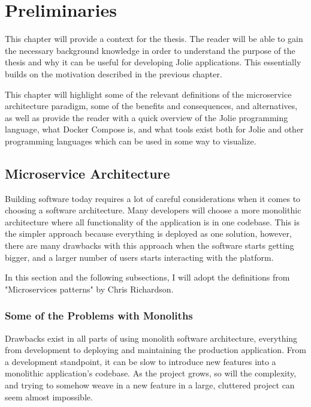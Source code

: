 \chapter{Preliminaries}
This chapter will provide a context for the thesis.
The reader will be able to gain the necessary background knowledge in order
to understand the purpose of the thesis and why it can be useful for developing Jolie applications. This 
essentially builds on the motivation
described in the previous chapter.

This chapter will highlight some of the relevant definitions of the microservice architecture paradigm, some of the benefits and consequences, and alternatives, as
 well as provide
the reader with a quick overview of the Jolie programming language,
what Docker Compose is, and what tools exist
both for Jolie and other programming languages which can be used in some way to visualize.

\section{Microservice Architecture}
Building software today requires a lot of careful considerations when it comes
to choosing a software architecture. Many developers will choose a more monolithic architecture where all
 functionality of the application
is in one codebase. This is the simpler approach because everything is deployed as one solution, however,
 there are many drawbacks
with this approach when the software starts getting bigger, and a larger number of users starts 
interacting with the platform.

In this section and the following subsections, I will adopt the definitions from "Microservices patterns"
 by Chris Richardson. \cite{microservicepatterns}

\subsection{Some of the Problems with Monoliths}
Drawbacks exist in all parts of using monolith software architecture, everything from development to 
deploying and maintaining the production application.
From a development standpoint, it can be slow to introduce new features into a monolithic application's
 codebase. As the project grows, so will the complexity, and trying to somehow weave in a new feature in a large, cluttered project can seem almost impossible.

